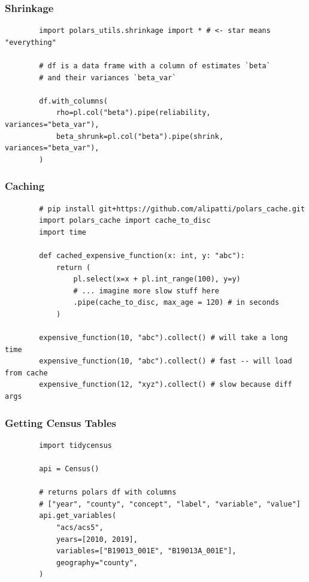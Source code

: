 \documentclass{ali-presentation}
\begin{document}
\begin{frame}[fragile]
    \frametitle{Shrinkage}

    \begin{verbatim}
        import polars_utils.shrinkage import * # <- star means "everything"

        # df is a data frame with a column of estimates `beta`
        # and their variances `beta_var`

        df.with_columns(
            rho=pl.col("beta").pipe(reliability, variances="beta_var"),
            beta_shrunk=pl.col("beta").pipe(shrink, variances="beta_var"),
        )
    \end{verbatim}
\end{frame}

\begin{frame}[fragile]
    \frametitle{Caching}

    \begin{verbatim}
        # pip install git+https://github.com/alipatti/polars_cache.git
        import polars_cache import cache_to_disc 
        import time
        
        def cached_expensive_function(x: int, y: "abc"):
            return (
                pl.select(x=x + pl.int_range(100), y=y)
                # ... imagine more slow stuff here
                .pipe(cache_to_disc, max_age = 120) # in seconds
            )
            
        expensive_function(10, "abc").collect() # will take a long time
        expensive_function(10, "abc").collect() # fast -- will load from cache
        expensive_function(12, "xyz").collect() # slow because diff args
    \end{verbatim}

\end{frame}

\begin{frame}[fragile]
    \frametitle{Getting Census Tables}

    \begin{verbatim}
        import tidycensus
        
        api = Census()
        
        # returns polars df with columns
        # ["year", "county", "concept", "label", "variable", "value"]
        api.get_variables(
            "acs/acs5",
            years=[2010, 2019],
            variables=["B19013_001E", "B19013A_001E"],
            geography="county",
        )
    \end{verbatim}
\end{frame}
\end{document}
